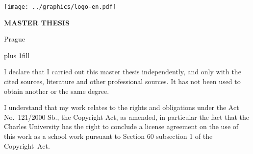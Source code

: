 

\pagestyle{empty}
\hypersetup{pageanchor=false}
\begin{center}

\centerline{\mbox{\texttt{[image: ../graphics/logo-en.pdf]}}}

\vspace{-8mm}
\vfill

{\bf\Large MASTER THESIS}

\vfill

{\LARGE\ThesisAuthor}

\vspace{15mm}

{\LARGE\bfseries\ThesisTitle}

\vfill

\Department

\vfill

{
\centerline{\vbox{}}}

\vfill

Prague \YearSubmitted

\end{center}

\newpage



\openright
\hypersetup{pageanchor=true}
\pagestyle{plain}
\vglue 0pt plus 1fill

\noindent
I declare that I carried out this master thesis independently, and only with the cited
sources, literature and other professional sources. It has not been used to obtain another
or the same degree.

\medskip\noindent
I understand that my work relates to the rights and obligations under the Act No.~121/2000 Sb.,
the Copyright Act, as amended, in particular the fact that the Charles
University has the right to conclude a license agreement on the use of this
work as a school work pursuant to Section 60 subsection 1 of the Copyright~Act.

